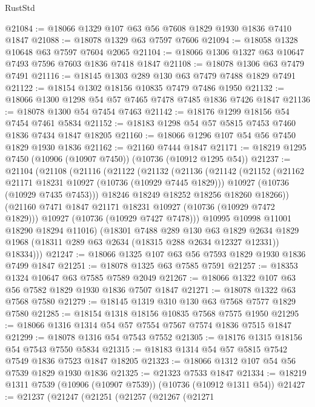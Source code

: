 \begin{lexlean}{RustStd}
\begin{coremodule}
@21084 := @18066 @1329 @107 @63 @56 @7608 @1829 @1930 @1836 @7410 @1847
@21088 := @18078 @1329 @63 @7597 @7606
@21094 := @18058 @1328 @10648 @63 @7597 @7604 @2065
@21104 := @18066 @1306 @1327 @63 @10647 @7493 @7596 @7603 @1836 @7418 @1847
@21108 := @18078 @1306 @63 @7479 @7491
@21116 := @18145 @1303 @289 @130 @63 @7479 @7488 @1829 @7491
@21122 := @18154 @1302 @18156 @10835 @7479 @7486 @1950
@21132 := @18066 @1300 @1298 @54 @57 @7465 @7478 @7485 @1836 @7426 @1847
@21136 := @18078 @1300 @54 @7454 @7463
@21142 := @18176 @1299 @18156 @54 @7454 @7461 @5834
@21152 := @18183 @1298 @54 @57 @5815 @7453 @7460 @1836 @7434 @1847 @18205
@21160 := @18066 @1296 @107 @54 @56 @7450 @1829 @1930 @1836
@21162 := @21160 @7444 @1847
@21171 := @18219 @1295 @7450 (@10906 (@10907 @7450)) (@10736 (@10912 @1295 @54))
@21237 := @21104
    (@21108
      (@21116
        (@21122
          (@21132
            (@21136
              (@21142
                (@21152
                  (@21162 @21171 @18231 @10927 (@10736 (@10929 @7445 @1829)))
                  @10927
                  (@10736 (@10929 @7435 @7453)))
                @18246
                @18249
                @18252
                @18256
                @18260
                @18266))
            (@21160 @7471 @1847 @21171 @18231 @10927 (@10736 (@10929 @7472 @1829)))
            @10927
            (@10736 (@10929 @7427 @7478)))
          @10995
          @10998
          @11001
          @18290
          @18294
          @11016)
        (@18301
          @7488
          @289
          @130
          @63
          @1829
          @2634
          @1829
          @1968
          (@18311 @289 @63 @2634 (@18315 @288 @2634 @12327 @12331))
          @18334)))
@21247 := @18066 @1325 @107 @63 @56 @7593 @1829 @1930 @1836 @7499 @1847
@21251 := @18078 @1325 @63 @7585 @7591
@21257 := @18353 @1324 @10647 @63 @7585 @7589 @2049
@21267 := @18066 @1322 @107 @63 @56 @7582 @1829 @1930 @1836 @7507 @1847
@21271 := @18078 @1322 @63 @7568 @7580
@21279 := @18145 @1319 @310 @130 @63 @7568 @7577 @1829 @7580
@21285 := @18154 @1318 @18156 @10835 @7568 @7575 @1950
@21295 := @18066 @1316 @1314 @54 @57 @7554 @7567 @7574 @1836 @7515 @1847
@21299 := @18078 @1316 @54 @7543 @7552
@21305 := @18176 @1315 @18156 @54 @7543 @7550 @5834
@21315 := @18183 @1314 @54 @57 @5815 @7542 @7549 @1836 @7523 @1847 @18205
@21323 := @18066 @1312 @107 @54 @56 @7539 @1829 @1930 @1836
@21325 := @21323 @7533 @1847
@21334 := @18219 @1311 @7539 (@10906 (@10907 @7539)) (@10736 (@10912 @1311 @54))
@21427 := @21237
    (@21247
      (@21251
        (@21257
          (@21267
            (@21271

\end{coremodule}
\end{lexlean}
